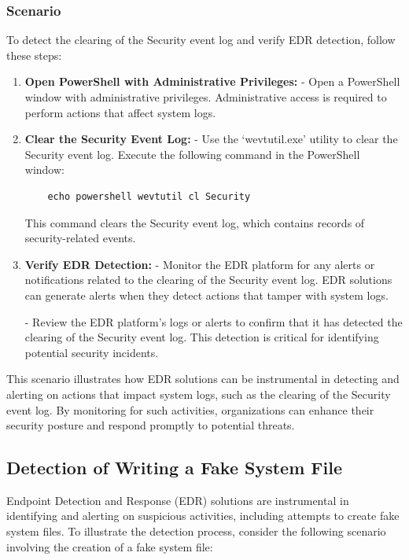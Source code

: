 \documentclass{article}
\begin{document}
\subsubsection{Scenario}

To detect the clearing of the Security event log and verify EDR detection, follow these steps:

\begin{enumerate}
    \item \textbf{Open PowerShell with Administrative Privileges:} 
    - Open a PowerShell window with administrative privileges. Administrative access is required to perform actions that affect system logs.
    
    \item \textbf{Clear the Security Event Log:} 
    - Use the `wevtutil.exe' utility to clear the Security event log. Execute the following command in the PowerShell window:

      \begin{verbatim}
    echo powershell wevtutil cl Security
    \end{verbatim}
 
    This command clears the Security event log, which contains records of security-related events.
    
    \item \textbf{Verify EDR Detection:} 
    - Monitor the EDR platform for any alerts or notifications related to the clearing of the Security event log. EDR solutions can generate alerts when they detect actions that tamper with system logs.
    
    - Review the EDR platform's logs or alerts to confirm that it has detected the clearing of the Security event log. This detection is critical for identifying potential security incidents.
\end{enumerate}

This scenario illustrates how EDR solutions can be instrumental in detecting and alerting on actions that impact system logs, such as the clearing of the Security event log. By monitoring for such activities, organizations can enhance their security posture and respond promptly to potential threats.


\subsection{Detection of Writing a Fake System File}

Endpoint Detection and Response (EDR) solutions are instrumental in identifying and alerting on suspicious activities, including attempts to create fake system files. To illustrate the detection process, consider the following scenario involving the creation of a fake system file:
\end{document}
